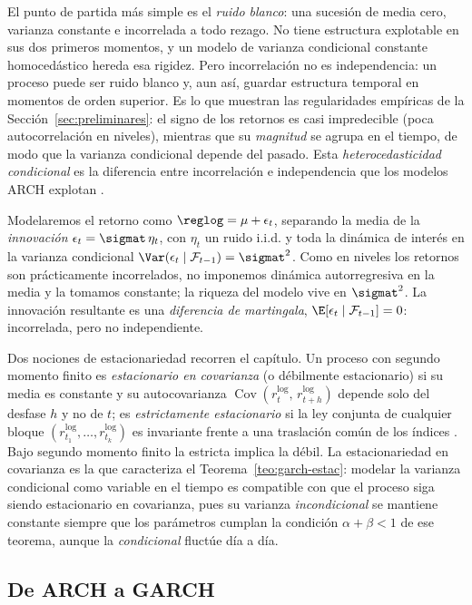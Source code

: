 El punto de partida más simple es el \emph{ruido blanco}: una sucesión de media cero, varianza constante e incorrelada a todo rezago. No tiene estructura explotable en sus dos primeros momentos, y un modelo de varianza condicional constante homocedástico hereda esa rigidez. Pero incorrelación no es independencia: un proceso puede ser ruido blanco y, aun así, guardar estructura temporal en momentos de orden superior. Es lo que muestran las regularidades empíricas de la Sección~\ref{sec:preliminares}: el signo de los retornos es casi impredecible (poca autocorrelación en niveles), mientras que su \emph{magnitud} se agrupa en el tiempo, de modo que la varianza condicional depende del pasado. Esta \emph{heterocedasticidad condicional} es la diferencia entre incorrelación e independencia que los modelos ARCH explotan \cite{cont2001}.

Modelaremos el retorno como $\reglog = \mu + \epsilon_t$, separando la media de la \emph{innovación} $\epsilon_t = \sigmat\, \eta_t$, con $\eta_t$ un ruido i.i.d. y toda la dinámica de interés en la varianza condicional $\Var(\epsilon_t \mid \mathcal{F}_{t-1}) = \sigmat^2$. Como en niveles los retornos son prácticamente incorrelados, no imponemos dinámica autorregresiva en la media y la tomamos constante; la riqueza del modelo vive en $\sigmat^2$. La innovación resultante es una \emph{diferencia de martingala}, $\E[\epsilon_t \mid \mathcal{F}_{t-1}] = 0$: incorrelada, pero no independiente.

Dos nociones de estacionariedad recorren el capítulo. Un proceso con segundo momento finito es \emph{estacionario en covarianza} (o débilmente estacionario) si su media es constante y su autocovarianza $\operatorname{Cov}(r^{\log}_{t},\, r^{\log}_{t+h})$ depende solo del desfase $h$ y no de $t$; es \emph{estrictamente estacionario} si la ley conjunta de cualquier bloque $(r^{\log}_{t_1}, \dots, r^{\log}_{t_k})$ es invariante frente a una traslación común de los índices \cite{brockwell1991}. Bajo segundo momento finito la estricta implica la débil. La estacionariedad en covarianza es la que caracteriza el Teorema~\ref{teo:garch-estac}: modelar la varianza condicional como variable en el tiempo es compatible con que el proceso siga siendo estacionario en covarianza, pues su varianza \emph{incondicional} se mantiene constante siempre que los parámetros cumplan la condición $\alpha+\beta<1$ de ese teorema, aunque la \emph{condicional} fluctúe día a día.

\subsection{De ARCH a GARCH}
\label{sec:garch-arch}

